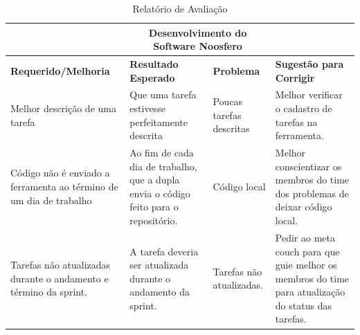 \documentclass[a4paper, 11pt]{article}
\begin{document}
\begin{table}[]
\centering
\begin{tabularx}{\textwidth}{|X|X|X|X|}
\hline

\rowcolor[HTML]{EFEFEF}
\multicolumn{2}{|c|}{\textbf{Processo Avaliado}} &
    \multicolumn{2}{|c|}{\textbf{Desenvolvimento do Software Noosfero}} \\ \hline

\rowcolor[HTML]{EFEFEF}
{\textbf{Requerido/Melhoria}} & {\textbf{Resultado Esperado}} &
{\textbf{Problema}} & {\textbf{Sugestão para Corrigir}} \\ \hline
Melhor descrição de uma tarefa & Que uma tarefa estivesse perfeitamente descrita
& Poucas tarefas descritas & Melhor verificar o cadastro de tarefas na ferramenta.\\ \hline

Código não é enviado a ferramenta ao término de um dia de trabalho & Ao fim
de cada dia de trabalho, que a dupla envia o código feito para o
repositório. & Código local & Melhor conscientizar os membros do time dos
problemas de deixar código local. \\ \hline

Tarefas não atualizadas durante o andamento e término da sprint. & A tarefa deveria
ser atualizada durante o andamento da sprint. & Tarefas não atualizadas. &
Pedir ao meta couch para que guie melhor os membros do time para atualização
do status das tarefas. \\ \hline

\end{tabularx}
\caption{Relatório de Avaliação}
\label{tab:relatorio_de_avaliacao}
\end{table}
\end{document}
